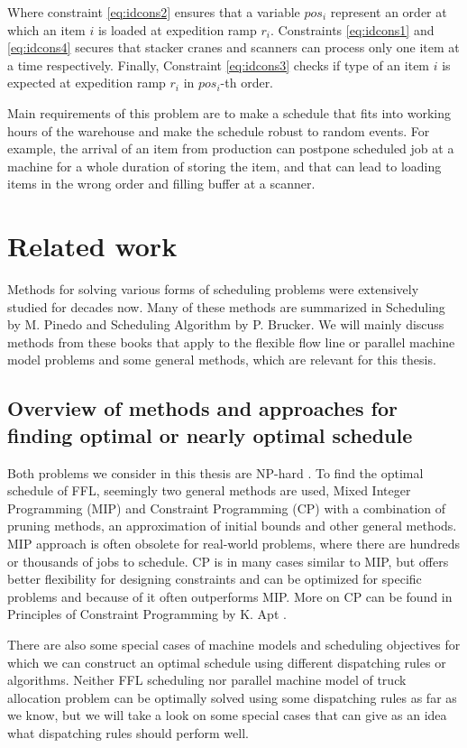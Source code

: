 \documentclass{ctuthesis}
\begin{document}
Where constraint \ref{eq:idcons2} ensures that a variable $pos_i$ represent an order at which an item $i$ is loaded at expedition ramp $r_i$. Constraints \ref{eq:idcons1} and \ref{eq:idcons4} secures that stacker cranes and scanners can process only one item at a time respectively. Finally, Constraint \ref{eq:idcons3} checks if type of an item $i$ is expected at expedition ramp $r_i$ in $pos_i$-th order.

Main requirements of this problem are to make a schedule that fits into working hours of the warehouse and make the schedule robust to random events. For example, the arrival of an item from production can postpone scheduled job at a machine for a whole duration of storing the item, and that can lead to loading items in the wrong order and filling buffer at a scanner. 



\chapter{Related work}
\label{chap:Related work}
Methods for solving various forms of scheduling problems were extensively studied for decades now. Many of these methods are summarized in Scheduling by M. Pinedo \cite{pinedo} and Scheduling Algorithm by P. Brucker\cite{bucker}. We will mainly discuss methods from these books that apply to the flexible flow line or parallel machine model problems and some general methods, which are relevant for this thesis. 

\section{Overview of methods and approaches for finding optimal or nearly optimal schedule}

Both problems we consider in this thesis are NP-hard \cite{pinedo}. To find the optimal schedule of FFL, seemingly two general methods are used, Mixed Integer Programming (MIP) and Constraint Programming (CP) with a combination of pruning methods, an approximation of initial bounds and other general methods. MIP approach is often obsolete for real-world problems, where there are hundreds or thousands of jobs to schedule. CP is in many cases similar to MIP, but offers better flexibility for designing constraints and can be optimized for specific problems and because of it often outperforms MIP. More on CP can be found in Principles of Constraint Programming by K. Apt \cite{cp}.

There are also some special cases of machine models and scheduling objectives for which we can construct an optimal schedule using different dispatching rules or algorithms. Neither FFL scheduling nor parallel machine model of truck allocation problem can be optimally solved using some dispatching rules as far as we know, but we will take a look on some special cases that can give as an idea what dispatching rules should perform well.
\end{document}
